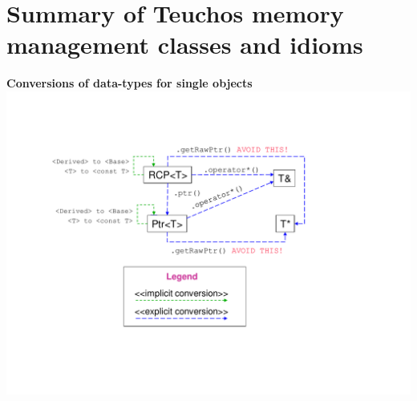 

%
{}\section{Summary of Teuchos memory management classes and idioms}
\label{apdx:summary_of_idioms}
%

\begin{center}















\pagebreak



\pagebreak



\pagebreak





\pagebreak

{}\textbf{Conversions of data-types for single objects}
\includegraphics*[trim= 1.0in 1.5in 1.7in 1.2in, scale=0.65]
{TeuchosPtrConversions}
\\[5ex]



\end{center}
